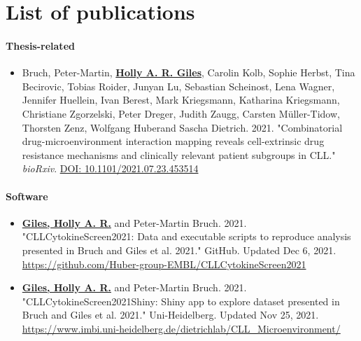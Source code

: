 \documentclass[11pt, a4paper, twosided]{book}
\begin{document}
\begin{sloppypar}
    \hypertarget{list-of-publications}{%
    \chapter*{List of publications}\label{list-of-publications}}

    \hypertarget{thesis-related}{%
    \subsubsection*{Thesis-related}\label{thesis-related}}
    \begin{itemize}
        \item Bruch, Peter-Martin\ast,  \textbf{\underline{Holly A. R. Giles}}\ast, Carolin Kolb, Sophie Herbst, Tina Becirovic, Tobias Roider, Junyan Lu, Sebastian Scheinost, Lena Wagner, Jennifer Huellein, Ivan Berest, Mark Kriegsmann, Katharina Kriegsmann, Christiane Zgorzelski, Peter Dreger, Judith Zaugg, Carsten Müller-Tidow, Thorsten Zenz, Wolfgang Huber\ast  and Sascha Dietrich\ast. 2021. "Combinatorial drug-microenvironment interaction mapping reveals cell-extrinsic drug resistance mechanisms and clinically relevant patient subgroups in CLL." \textit{bioRxiv}. \href{https://doi.org/10.1101/2021.07.23.453514}{DOI: 10.1101/2021.07.23.453514} 
        
    \end{itemize}
    \hypertarget{software}{%
    \subsubsection{Software}\label{software}}
    \begin{itemize}
      \item \textbf{\underline{Giles, Holly A. R.}} and Peter-Martin Bruch. 2021. "CLLCytokineScreen2021: Data and executable scripts to reproduce analysis presented in Bruch and Giles et al. 2021." GitHub. Updated Dec 6, 2021. \href{https://github.com/Huber-group-EMBL/CLLCytokineScreen2021}{https://github.com/Huber-group-EMBL/CLLCytokineScreen2021}
      
       \item \textbf{\underline{Giles, Holly A. R.}} and Peter-Martin Bruch. 2021. "CLLCytokineScreen2021Shiny: Shiny app to explore dataset presented in Bruch and Giles et al. 2021." Uni-Heidelberg. Updated Nov 25, 2021. \href{https://www.imbi.uni-heidelberg.de/dietrichlab/CLL_Microenvironment/}{https://www.imbi.uni-heidelberg.de/dietrichlab/CLL_Microenvironment/} 
    \end{itemize}
    \hypertarget{other-contributions}{%
}
\end{sloppypar}
\end{document}
